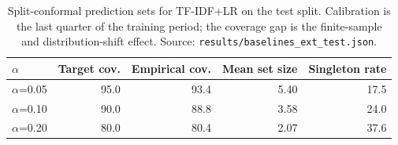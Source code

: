 \begin{table}[t]\centering
\caption{Split-conformal prediction sets for TF-IDF+LR on the test split. Calibration is the last quarter of the training period; the coverage gap is the finite-sample and distribution-shift effect. Source: \texttt{results/baselines\_ext\_test.json}.}
\label{tab:conformal-test}
\begin{tabular}{lrrrr}
\toprule
$\alpha$ & Target cov. & Empirical cov. & Mean set size & Singleton rate \\
\midrule
$\alpha$=0.05 & 95.0 & 93.4 & 5.40 & 17.5 \\
$\alpha$=0.10 & 90.0 & 88.8 & 3.58 & 24.0 \\
$\alpha$=0.20 & 80.0 & 80.4 & 2.07 & 37.6 \\
\bottomrule
\end{tabular}
\end{table}
